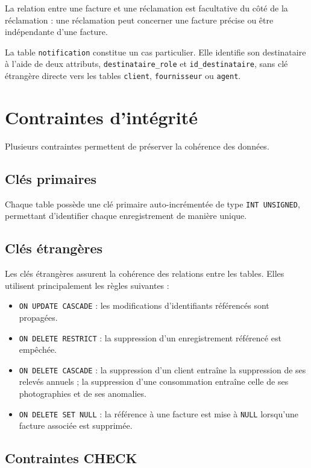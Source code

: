 La relation entre une facture et une réclamation est facultative du côté de la réclamation : une réclamation peut concerner une facture précise ou être indépendante d'une facture.

La table \texttt{notification} constitue un cas particulier. Elle identifie son destinataire à l'aide de deux attributs, \texttt{destinataire\_role} et \texttt{id\_destinataire}, sans clé étrangère directe vers les tables \texttt{client}, \texttt{fournisseur} ou \texttt{agent}.

\section{Contraintes d'intégrité}

Plusieurs contraintes permettent de préserver la cohérence des données.

\subsection*{Clés primaires}

Chaque table possède une clé primaire auto-incrémentée de type \texttt{INT UNSIGNED}, permettant d'identifier chaque enregistrement de manière unique.

\subsection*{Clés étrangères}

Les clés étrangères assurent la cohérence des relations entre les tables. Elles utilisent principalement les règles suivantes :

\begin{itemize}[leftmargin=*]
    \item \texttt{ON UPDATE CASCADE} : les modifications d'identifiants référencés sont propagées.
    \item \texttt{ON DELETE RESTRICT} : la suppression d'un enregistrement référencé est empêchée.
    \item \texttt{ON DELETE CASCADE} : la suppression d'un client entraîne la suppression de ses relevés annuels ; la suppression d'une consommation entraîne celle de ses photographies et de ses anomalies.
    \item \texttt{ON DELETE SET NULL} : la référence à une facture est mise à \texttt{NULL} lorsqu'une facture associée est supprimée.
\end{itemize}

\subsection*{Contraintes CHECK}

